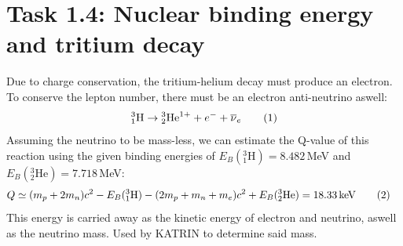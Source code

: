 \documentclass[a4paper,12pt]{article}
\newcommand\numberthis{\addtocounter{equation}{1}\tag{\theequation}}
\newcommand{\tecxt}{}
\begin{document}
\section*{Task 1.4: Nuclear binding energy and tritium decay}
Due to charge conservation, the tritium-helium decay must produce an electron. To conserve the lepton number, there must be an electron anti-neutrino aswell:
\begin{align*}
{}^3_1\tecxt\text{H}\rightarrow{}^3_2\tecxt\text{He}^{1+}+e^-+\overline{\nu}_e\numberthis\label{Tritium helium decay reaction}
\end{align*}
Assuming the neutrino to be mass-less, we can estimate the Q-value of this reaction using the given binding energies of $E_B(^3_1\tecxt\text{H})=8.482$\,MeV and $E_B(^3_2\tecxt\text{He})=7.718$\,MeV:
\begin{align*}
Q&\simeq (m_p+2m_n)c^2-E_B(^3_1\tecxt\text{H})-(2m_p+m_n+m_e)c^2+E_B(^3_2\tecxt\text{He})=18.33\,\tecxt\text{keV}\numberthis\label{Q value of tritium decay}
\end{align*}
This energy is carried away as the kinetic energy of electron and neutrino, aswell as the neutrino mass. Used by KATRIN to determine said mass.
\end{document}
